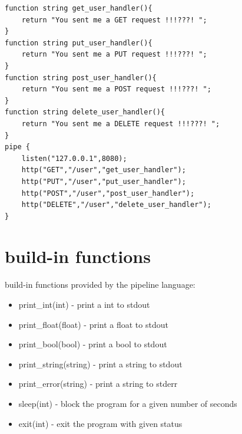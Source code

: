 \documentclass[./Report_main.tex]{subfiles}
\begin{document}
\begin{lstlisting}
function string get_user_handler(){
    return "You sent me a GET request !!!???! ";
}
function string put_user_handler(){
    return "You sent me a PUT request !!!???! ";
}
function string post_user_handler(){
    return "You sent me a POST request !!!???! ";
}
function string delete_user_handler(){
    return "You sent me a DELETE request !!!???! ";
}
pipe {
    listen("127.0.0.1",8080);
    http("GET","/user","get_user_handler");
    http("PUT","/user","put_user_handler");
    http("POST","/user","post_user_handler");
    http("DELETE","/user","delete_user_handler");
}

\end{lstlisting}
    


\section{build-in functions}
build-in functions provided by the pipeline language:\\
\begin{itemize}
    \item print\_int(int) - print a int to stdout
    \item print\_float(float) - print a float to stdout
    \item print\_bool(bool) - print a bool to stdout
    \item print\_string(string) - print a string to stdout
    \item print\_error(string) - print a string to stderr
    \item sleep(int) - block the program for a given number of seconds
    \item exit(int) - exit the program with given status
\end{itemize}
\end{document}

